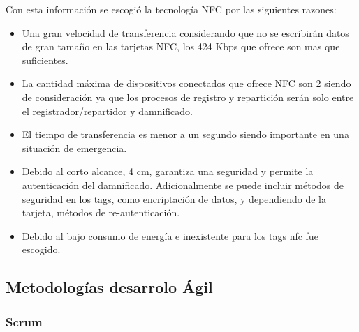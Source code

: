 \documentclass[11pt,openany]{book}
\newcounter{ns}
\begin{document}
	Con esta información se escogió la tecnología NFC por las siguientes razones:
	\begin{itemize}
		\item Una gran velocidad de transferencia considerando que no se escribirán datos de gran tamaño en las tarjetas NFC, los 424 Kbps que ofrece son mas que suficientes.
		\item La cantidad máxima de dispositivos conectados que ofrece NFC son 2 siendo de consideración ya que los procesos de registro y repartición serán solo entre el registrador/repartidor y damnificado.
		\item El tiempo de transferencia es menor a un segundo siendo importante en una situación de emergencia.
		\item Debido al corto alcance, 4 cm, garantiza una seguridad y permite la autenticación del damnificado. Adicionalmente se puede incluir métodos de seguridad en los tags, como encriptación de datos, y dependiendo de la tarjeta, métodos de re-autenticación.
		\item Debido al bajo consumo de energía e inexistente para los tags nfc fue escogido.
	\end{itemize}

	\subsection{Metodologías desarrolo Ágil}
	\subsubsection{Scrum}
\end{document}
